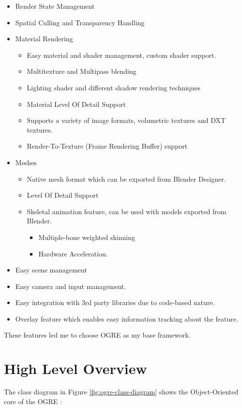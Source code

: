 \begin{itemize}
\item Render State Management
\item Spatial Culling and Transparency Handling
\item Material Rendering
\begin{itemize}
  \item Easy material and shader management, custom shader support.
  \item Multitexture and Multipass blending
  \item Lighting shader and different shadow rendering techniques
  \item Material Level Of Detail Support
  \item Supports a variety of image formats, volumetric textures and DXT textures.
  \item Render-To-Texture (Frame Rendering Buffer) support
\end{itemize}
\item Meshes
\begin{itemize}
  \item Native mesh format which can be exported from Blender Designer.
  \item Level Of Detail Support
  \item Skeletal animation feature, can be used with models exported from Blender.
\begin{itemize}
  \item Multiple-bone weighted skinning
  \item Hardware Acceleration.
\end{itemize}
\end{itemize}
\item Easy scene management
\item Easy camera and input management.
\item Easy integration with 3rd party libraries due to code-based nature.
\item Overlay feature which enables easy information tracking about the feature.
\end{itemize}

These features led me to choose OGRE as my base framework.


\section{High Level Overview}
The class diagram in Figure \ref{fig:ogre-class-diagram}  shows the Object-Oriented core of the OGRE \cite{Moan2012}:

